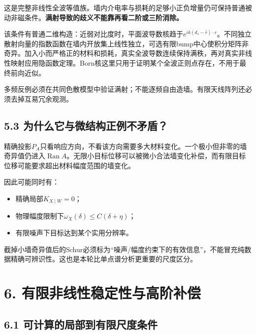 \documentclass[
  10pt,
  a4paper,
]{article}
\providecommand{\tightlist}{%
  \setlength{\itemsep}{0pt}\setlength{\parskip}{0pt}}
\providecommand{\tightlist}{\setlength{\itemsep}{1pt}\setlength{\parskip}{1pt}}
\begin{document}
这是完整非线性全波等值族。墙内介电率与损耗的足够小正负增量仍可保持普通被动非磁条件。\textbf{满射导致的歧义不能靠再看二阶或三阶消除。}

该条件有普通二维构造：近弱对比度时，平面波导数核趋于\(e^{ik(d_s-\widehat r)\cdot r}\)。不同独立散射向量的指数函数在墙内开放集上线性独立，可选有限bump中心使积分矩阵非奇异。加入小而严格正的材料和损耗，真实全波导数连续保持满秩，再对真实非线性映射应用隐函数定理。Born核这里只用于证明某个全波正则点存在，不用于最终前向近似。

多频反例必须在共同色散模型中验证满射；不能逐频自由造墙。有限天线阵列还必须去掉互易冗余观测。

\hypertarget{ux4e3aux4ec0ux4e48ux5b83ux4e0eux5faeux7ed3ux6784ux6b63ux4f8bux4e0dux77dbux76fe}{%
\subsection{5.3
为什么它与微结构正例不矛盾？}\label{ux4e3aux4ec0ux4e48ux5b83ux4e0eux5faeux7ed3ux6784ux6b63ux4f8bux4e0dux77dbux76fe}}

精确投影\(P_A\)只看响应方向，不看该方向需要多大材料变化。一个极小但非零的墙奇异值仍进入\(\operatorname{Ran}A\)。无限小目标位移可以被微小合法墙变化补偿，而有限目标位移可能要求超出材料幅度范围的墙变化。

因此可能同时有：

\begin{itemize}
\tightlist
\item
  精确局部\(K_{X\mid W}=0\)；
\item
  物理幅度限制下\(\omega_X(\delta)\le C(\delta+\eta)\)；
\item
  有限噪声下目标达到某个实用分辨率。
\end{itemize}

截掉小墙奇异值后的Schur必须标为``噪声/幅度约束下的有效信息''，不能冒充纯数据精确可辨识性。这也是本轮比单点谱分析更重要的尺度区分。

\hypertarget{ux6709ux9650ux975eux7ebfux6027ux7a33ux5b9aux6027ux4e0eux9ad8ux9636ux8865ux507f}{%
\section{6.
有限非线性稳定性与高阶补偿}\label{ux6709ux9650ux975eux7ebfux6027ux7a33ux5b9aux6027ux4e0eux9ad8ux9636ux8865ux507f}}

\hypertarget{ux53efux8ba1ux7b97ux7684ux5c40ux90e8ux5230ux6709ux9650ux5c3aux5ea6ux6761ux4ef6}{%
\subsection{6.1
可计算的局部到有限尺度条件}\label{ux53efux8ba1ux7b97ux7684ux5c40ux90e8ux5230ux6709ux9650ux5c3aux5ea6ux6761ux4ef6}}
\end{document}

